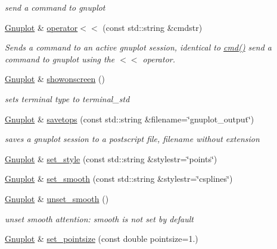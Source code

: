 \begin{DoxyCompactItemize}
\begin{DoxyCompactList}\small\item\em send a command to gnuplot \end{DoxyCompactList}\item 
\hyperlink{class_gnuplot}{Gnuplot} \& \hyperlink{class_gnuplot_afb69631c7a498077e378a3cbb56f38c8}{operator$<$$<$} (const std\-::string \&cmdstr)
\begin{DoxyCompactList}\small\item\em Sends a command to an active gnuplot session, identical to \hyperlink{class_gnuplot_a07607803ede8dd5416906df0a1924fc5}{cmd()} send a command to gnuplot using the $<$$<$ operator. \end{DoxyCompactList}\item 
\hypertarget{class_gnuplot_a356d2faaa79f08d13fec9718b776b28d}{\hyperlink{class_gnuplot}{Gnuplot} \& \hyperlink{class_gnuplot_a356d2faaa79f08d13fec9718b776b28d}{showonscreen} ()}\label{class_gnuplot_a356d2faaa79f08d13fec9718b776b28d}

\begin{DoxyCompactList}\small\item\em sets terminal type to terminal\-\_\-std \end{DoxyCompactList}\item 
\hypertarget{class_gnuplot_a032072c7c01b508a7535a17fb08562b1}{\hyperlink{class_gnuplot}{Gnuplot} \& \hyperlink{class_gnuplot_a032072c7c01b508a7535a17fb08562b1}{savetops} (const std\-::string \&filename=\char`\"{}gnuplot\-\_\-output\char`\"{})}\label{class_gnuplot_a032072c7c01b508a7535a17fb08562b1}

\begin{DoxyCompactList}\small\item\em saves a gnuplot session to a postscript file, filename without extension \end{DoxyCompactList}\item 
\hyperlink{class_gnuplot}{Gnuplot} \& \hyperlink{class_gnuplot_acfdcda292650775ebed4683e8e1515b5}{set\-\_\-style} (const std\-::string \&stylestr=\char`\"{}points\char`\"{})
\item 
\hyperlink{class_gnuplot}{Gnuplot} \& \hyperlink{class_gnuplot_aa18386919da2ec4c994f1f9c7195d384}{set\-\_\-smooth} (const std\-::string \&stylestr=\char`\"{}csplines\char`\"{})
\item 
\hyperlink{class_gnuplot}{Gnuplot} \& \hyperlink{class_gnuplot_ad9dfbccd66dece1dbe5803605c6ab08c}{unset\-\_\-smooth} ()
\begin{DoxyCompactList}\small\item\em unset smooth attention\-: smooth is not set by default \end{DoxyCompactList}\item 
\hypertarget{class_gnuplot_a95ec1636a871447dfe99463b769339c7}{\hyperlink{class_gnuplot}{Gnuplot} \& \hyperlink{class_gnuplot_a95ec1636a871447dfe99463b769339c7}{set\-\_\-pointsize} (const double pointsize=1.)}\label{class_gnuplot_a95ec1636a871447dfe99463b769339c7}


\end{DoxyCompactItemize}
